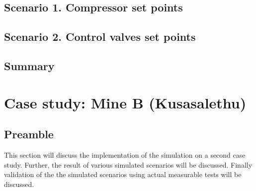 \subsection{Scenario 1. Compressor set points}
\subsection{Scenario 2. Control valves set points}
\subsection{Summary}

\section{Case study: Mine B \color{blue}(Kusasalethu)}
	\subsection{Preamble}
	 This section will discuss the implementation of the simulation on a second case study. Further, the result of various simulated scenarios will be discussed. Finally validation of the the simulated scenarios using actual measurable tests will be discussed.
